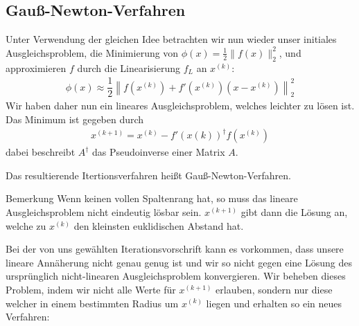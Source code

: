 \subsection{Gauß-Newton-Verfahren}
Unter Verwendung der gleichen Idee betrachten wir nun wieder unser initiales Ausgleichsproblem, 
die Minimierung von $\phi(x) = \frac{1}{2}\|f(x)\|_2^2$, und approximieren $f$ durch die Linearisierung 
$f_L$ an $x^{(k)}$:
%
\begin{align*}
  \phi(x) \approx \dfrac{1}{2} \left\| f(x^{(k)}) + f'(x^{(k)})(x - x^{(k)}) \right\|_2^2
\end{align*}
%
Wir haben daher nun ein lineares Ausgleichsproblem, welches leichter zu lösen ist. Das Minimum ist
gegeben durch
%
\begin{align*}
  x^{(k+1)} = x^{(k)} - f'(x(k))^\dagger f(x^{(k)})
\end{align*}
%
dabei beschreibt $A^\dagger$ das Pseudoinverse einer Matrix $A$.

Das resultierende Itertionsverfahren heißt Gauß-Newton-Verfahren.

\begin{colbox}{Bemerkung}
  Wenn keinen vollen Spaltenrang hat, so muss das lineare Ausgleichsproblem nicht eindeutig lösbar sein.
  $x^{(k+1)}$ gibt dann die Lösung an, welche zu $x^{(k)}$ den kleinsten euklidischen Abstand hat.
\end{colbox}

Bei der von uns gewählten Iterationsvorschrift kann es vorkommen, dass unsere lineare Annäherung
nicht genau genug ist und wir so nicht gegen eine Lösung des ursprünglich nicht-linearen Ausgleichsproblem konvergieren. 
Wir beheben dieses Problem, indem wir nicht alle Werte für $x^{(k+1)}$ erlauben,
sondern nur diese welcher in einem bestimmten Radius um $x^{(k)}$ liegen und erhalten so ein neues
Verfahren:

